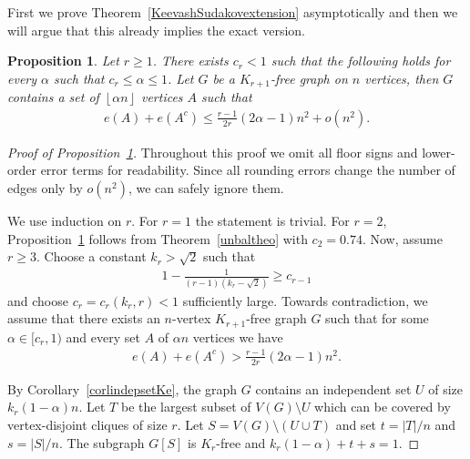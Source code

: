\documentclass[11pt]{article}
\newtheorem{prop}[theo]{Proposition}
\theoremstyle{definition}
\numberwithin{theo}{section}
\begin{document}
First we prove Theorem~\ref{KeevashSudakovextension} asymptotically and then we will argue that this already implies the exact version.
\begin{prop}
\label{KeevashSudakovextensionprop}
Let $r\geq 1$. There exists $c_r<1$ such that the following holds for every $\alpha$ such that $c_r\leq \alpha\leq 1$. Let $G$ be a $K_{r+1}$-free graph on $n$ vertices, then $G$ contains a set of $\left\lfloor \alpha n\right\rfloor$ vertices $A$ such that 
\begin{align*}
    e(A)+e(A^c)\leq  \frac{r-1}{2r}(2\alpha-1)n^2+o(n^2).
\end{align*}
\end{prop}
\begin{proof}[Proof of Proposition~\ref{KeevashSudakovextensionprop}]
Throughout this proof we omit all floor signs and lower-order error terms for readability. Since all rounding errors change the number of edges only by $o(n^2)$, we can safely ignore them.

We use induction on $r$. For $r=1$ the statement is trivial. For $r=2$, Proposition~\ref{KeevashSudakovextensionprop} follows from Theorem~\ref{unbaltheo} with $c_2=0.74$. Now, assume $r\geq 3$. Choose a constant $k_r>\sqrt{2}$ such that 
\begin{align*}
    1-\frac{1}{(r-1)(k_r-\sqrt{2})}\geq c_{r-1}
\end{align*}
and choose $c_r=c_r(k_r,r)<1$ sufficiently large. Towards contradiction, we assume that there exists an $n$-vertex $K_{r+1}$-free graph $G$ such that for some $\alpha\in [c_r,1)$ and every set $A$ of $\alpha n$ vertices we have 
\begin{align}
\label{cutassumption}
    e(A)+e(A^c)> \frac{r-1}{2r}(2\alpha-1)n^2.
\end{align}

By Corollary~\ref{corlindepsetKe}, the graph $G$ contains an independent set $U$ of size $k_r(1-\alpha)n$. Let $T$ be the largest subset of $V(G)\setminus U$ which can be covered by vertex-disjoint cliques of size $r$. Let $S=V(G)\setminus(U\cup T)$ and set $t=|T|/n$ and $s =|S|/n$. The subgraph $G[S]$ is $K_r$-free and $k_r(1-\alpha) + t + s = 1$.


\end{proof}
\end{document}
